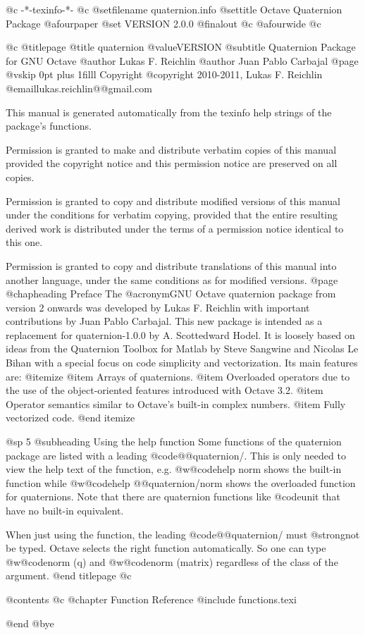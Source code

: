    @c -*-texinfo-*-
@c %
@setfilename quaternion.info
@settitle Octave Quaternion Package
@afourpaper
@set VERSION 2.0.0
@finalout
@c @afourwide
@c %

@c %
@titlepage
@title quaternion @value{VERSION}
@subtitle Quaternion Package for GNU Octave
@author Lukas F. Reichlin
@author Juan Pablo Carbajal
@page
@vskip 0pt plus 1filll
Copyright @copyright{} 2010-2011, Lukas F. Reichlin @email{lukas.reichlin@@gmail.com}

This manual is generated automatically from the texinfo help strings
of the package's functions.

Permission is granted to make and distribute verbatim copies of
this manual provided the copyright notice and this permission notice
are preserved on all copies.

Permission is granted to copy and distribute modified versions of this
manual under the conditions for verbatim copying, provided that the entire
resulting derived work is distributed under the terms of a permission
notice identical to this one.

Permission is granted to copy and distribute translations of this manual
into another language, under the same conditions as for modified versions.
@page
@chapheading Preface
The @acronym{GNU} Octave quaternion package from version 2 onwards
was developed by Lukas F. Reichlin with important contributions by
Juan Pablo Carbajal. This new package is intended as a replacement
for quaternion-1.0.0 by A. Scottedward Hodel. It is loosely based
on ideas from the Quaternion Toolbox for Matlab by Steve Sangwine
and Nicolas Le Bihan with a special focus on code simplicity and
vectorization. Its main features are:
@itemize
@item Arrays of quaternions.
@item Overloaded operators due to the use of the object-oriented features
introduced with Octave 3.2.
@item Operator semantics similar to Octave's built-in complex numbers.
@item Fully vectorized code.
@end itemize


@sp 5
@subheading Using the help function
Some functions of the quaternion package are listed with a leading @code{@@quaternion/}.
This is only needed to view the help text of the function, e.g. @w{@code{help norm}}
shows the built-in function while @w{@code{help @@quaternion/norm}} shows the overloaded
function for quaternions. Note that there are quaternion functions
like @code{unit} that have no built-in equivalent.

When just using the function, the leading @code{@@quaternion/} must @strong{not} be typed.
Octave selects the right function automatically. So one can type @w{@code{norm (q)}}
and @w{@code{norm (matrix)}} regardless of the class of the argument.
@end titlepage
@c %

@contents
@c @chapter Function Reference
@include functions.texi

@end
@bye
